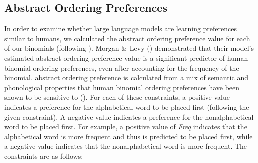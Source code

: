\documentclass[
  nottoc]{article}
\begin{document}
\subsection{Abstract Ordering
Preferences}\label{abstract-ordering-preferences}

In order to examine whether large language models are learning
preferences similar to humans, we calculated the abstract ordering
preference value for each of our binomials (following
).
Morgan \& Levy ()
demonstrated that their model's estimated abstract ordering preference
value is a significant predictor of human binomial ordering preferences,
even after accounting for the frequency of the binomial. abstract
ordering preference is calculated from a mix of semantic and
phonological properties that human binomial ordering preferences have
been shown to be sensitive to
().
For each of these constraints, a positive value indicates a preference
for the alphabetical word to be placed first (following the given
constraint). A negative value indicates a preference for the
nonalphabetical word to be placed first. For example, a positive value
of \emph{Freq} indicates that the alphabetical word is more frequent and
thus is predicted to be placed first, while a negative value indicates
that the nonalphabetical word is more frequent. The constraints are as
follows:
\end{document}
